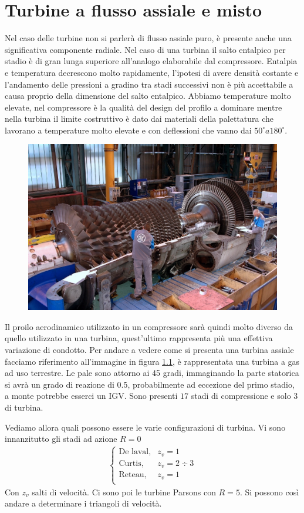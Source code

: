 \chapter{Turbine a flusso assiale e misto}
Nel caso delle turbine non si parlerà di flusso assiale puro, è presente anche una significativa componente radiale. Nel caso di una turbina il salto entalpico per stadio è di gran lunga superiore all'analogo elaborabile dal compressore. Entalpia e temperatura decrescono molto rapidamente, l'ipotesi di avere densità costante e l'andamento delle pressioni a gradino tra stadi successivi non è più accettabile a causa proprio della dimensione del salto entalpico. Abbiamo temperature molto elevate, nel compressore è la qualità del design del profilo a dominare mentre nella turbina il limite costruttivo è dato dai materiali della palettatura che lavorano a temperature molto elevate e con deflessioni che vanno dai $50^{\circ} a 180^{\circ}$. 
\begin{figure}[h!]
\centering
  \includegraphics[width=.9\textwidth]{fig/TurboGas.png}
\caption{}
\label{fig:TurboGas}
\end{figure}
Il proilo aerodinamico utilizzato in un compressore sarà quindi molto diverso da quello utilizzato in una turbina, quest'ultimo rappresenta più una effettiva variazione di condotto. 
Per andare a vedere come si presenta una turbina assiale facciamo riferimento all'immagine in figura \ref{fig:TurboGas}, è rappresentata una turbina a gas ad uso terrestre. Le pale sono attorno ai 45 gradi, immaginando la parte statorica si avrà un grado di reazione di 0.5, probabilmente ad eccezione del primo stadio, a monte potrebbe esserci un IGV. Sono presenti $17$ stadi di compressione e solo $3$ di turbina. 

Vediamo allora quali possono essere le varie configurazioni di turbina. 
Vi sono innanzitutto gli stadi ad azione $R = 0$
\begin{align*}
\begin{cases}
\mbox{De laval}, & z_v = 1\\
\mbox{Curtis}, & z_v = 2 \div 3\\
\mbox{Reteau}, & z_v = 1\\
\end{cases}
\end{align*}
Con $z_v$ salti di velocità. Ci sono poi le turbine Parsons con $R = 5$. Si possono così andare a determinare i triangoli di velocità.

